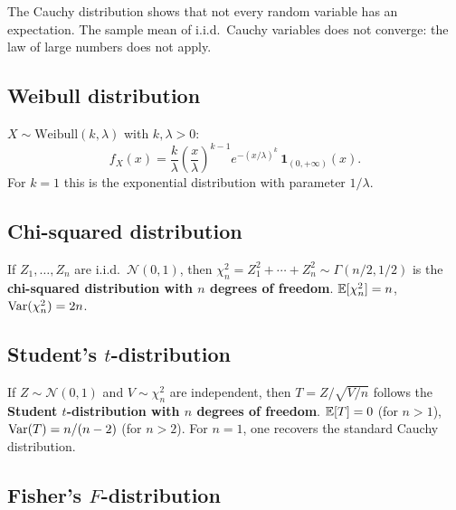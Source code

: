 \begin{warning}[title=\textbf{Cauchy has no moments}]
The Cauchy distribution shows that not every random variable has an expectation.
The sample mean of i.i.d.\ Cauchy variables does not converge: the law of large
numbers does not apply.
\end{warning}

\subsection{Weibull distribution}

\begin{definition}[Weibull]
$X \sim \mathrm{Weibull}(k, \lambda)$ with $k, \lambda > 0$:
\[
    f_X(x) = \frac{k}{\lambda}\left(\frac{x}{\lambda}\right)^{k-1}
    e^{-(x/\lambda)^k}\,\mathbf{1}_{(0,+\infty)}(x).
\]
For $k=1$ this is the exponential distribution with parameter $1/\lambda$.
\end{definition}

\subsection{Chi-squared distribution}

\begin{definition}
If $Z_1, \ldots, Z_n$ are i.i.d.\ $\mathcal{N}(0,1)$, then
$\chi^2_n = Z_1^2 + \cdots + Z_n^2 \sim \Gamma(n/2, 1/2)$ is the
\textbf{chi-squared distribution with $n$ degrees of freedom}.
$\mathbb{E}[\chi^2_n] = n$, $\mathrm{Var}(\chi^2_n) = 2n$.
\end{definition}

\subsection{Student's $t$-distribution}

\begin{definition}[Student's $t$]
If $Z \sim \mathcal{N}(0,1)$ and $V \sim \chi^2_n$ are independent, then
$T = Z/\sqrt{V/n}$ follows the \textbf{Student $t$-distribution with $n$ degrees
of freedom}. $\mathbb{E}[T] = 0$ (for $n > 1$), $\mathrm{Var}(T) = n/(n-2)$ (for $n > 2$).
For $n=1$, one recovers the standard Cauchy distribution.
\end{definition}

\subsection{Fisher's $F$-distribution}

